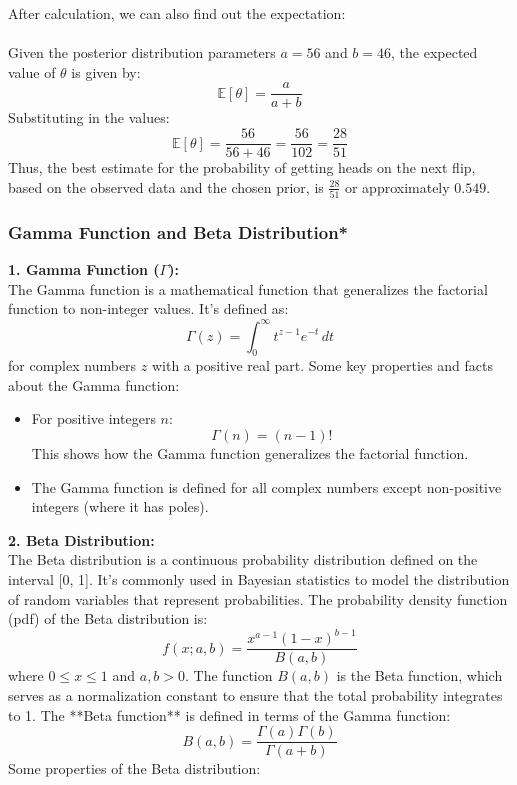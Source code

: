 \documentclass{article}
\begin{document}
After calculation, we can also find out the expectation:\\
 \\
Given the posterior distribution parameters \( a = 56 \) and \( b = 46 \), the expected value of \( \theta \) is given by:
\[ \mathbb{E}[\theta] = \frac{a}{a+b} \]
Substituting in the values:
\[ \mathbb{E}[\theta] = \frac{56}{56+46} = \frac{56}{102} = \frac{28}{51} \]
Thus, the best estimate for the probability of getting heads on the next flip, based on the observed data and the chosen prior, is \( \frac{28}{51} \) or approximately \( 0.549 \).
\subsubsection{Gamma Function and Beta Distribution*}
\textbf{1. Gamma Function (\( \Gamma \)): }\\
The Gamma function is a mathematical function that generalizes the factorial function to non-integer values. It's defined as:
\[ \Gamma(z) = \int_0^\infty t^{z-1} e^{-t} \, dt \]
for complex numbers \( z \) with a positive real part.
Some key properties and facts about the Gamma function:
\begin{itemize}
  \item For positive integers \( n \):
  \[ \Gamma(n) = (n-1)! \]
  This shows how the Gamma function generalizes the factorial function.
  
  \item The Gamma function is defined for all complex numbers except non-positive integers (where it has poles).
\end{itemize}
\textbf{2. Beta Distribution: }\\
The Beta distribution is a continuous probability distribution defined on the interval [0, 1]. It's commonly used in Bayesian statistics to model the distribution of random variables that represent probabilities.
The probability density function (pdf) of the Beta distribution is:
\[ f(x; a, b) = \frac{x^{a-1} (1-x)^{b-1}}{B(a,b)} \]
where \( 0 \leq x \leq 1 \) and \( a, b > 0 \). The function \( B(a,b) \) is the Beta function, which serves as a normalization constant to ensure that the total probability integrates to 1.
The **Beta function** is defined in terms of the Gamma function:
\[ B(a,b) = \frac{\Gamma(a) \Gamma(b)}{\Gamma(a+b)} \]
Some properties of the Beta distribution:
\end{document}
